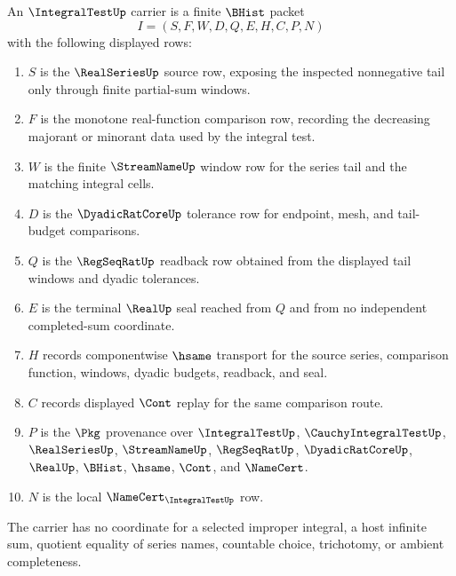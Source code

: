 \begin{definition}
\label{def:integral-test-carrier}
An $\IntegralTestUp$ carrier is a finite $\BHist$ packet
$$
I=(S,F,W,D,Q,E,H,C,P,N)
$$
with the following displayed rows:
\begin{enumerate}
\item $S$ is the $\RealSeriesUp$ source row, exposing the inspected nonnegative tail only through finite partial-sum windows.
\item $F$ is the monotone real-function comparison row, recording the decreasing majorant or minorant data used by the integral test.
\item $W$ is the finite $\StreamNameUp$ window row for the series tail and the matching integral cells.
\item $D$ is the $\DyadicRatCoreUp$ tolerance row for endpoint, mesh, and tail-budget comparisons.
\item $Q$ is the $\RegSeqRatUp$ readback row obtained from the displayed tail windows and dyadic tolerances.
\item $E$ is the terminal $\RealUp$ seal reached from $Q$ and from no independent completed-sum coordinate.
\item $H$ records componentwise $\hsame$ transport for the source series, comparison function, windows, dyadic budgets, readback, and seal.
\item $C$ records displayed $\Cont$ replay for the same comparison route.
\item $P$ is the $\Pkg$ provenance over $\IntegralTestUp$, $\CauchyIntegralTestUp$, $\RealSeriesUp$, $\StreamNameUp$, $\RegSeqRatUp$, $\DyadicRatCoreUp$, $\RealUp$, $\BHist$, $\hsame$, $\Cont$, and $\NameCert$.
\item $N$ is the local $\NameCert_{\IntegralTestUp}$ row.
\end{enumerate}
The carrier has no coordinate for a selected improper integral, a host infinite sum, quotient equality of series names, countable choice, trichotomy, or ambient completeness.
\end{definition}

